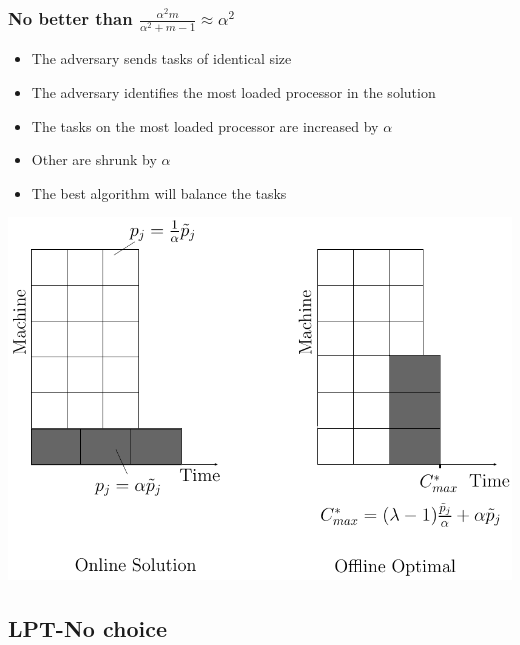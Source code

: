 \documentclass[usenames,dvipsnames]{beamer}
\begin{document}
\begin{frame}
  \frametitle{No better than $\frac{\alpha^{2}m }{\alpha^{2} + m-1} \approx \alpha^2$}

  \begin{itemize}
  \item The adversary sends tasks of identical size
  \item The adversary identifies the most loaded processor in the solution
  \item The tasks on the most loaded processor are increased by $\alpha$
  \item Other are shrunk by $\alpha$
  \item The best algorithm will balance the tasks
  \end{itemize}
  
  \begin{center}
    \includegraphics[width=.6\linewidth]{figs/model1.pdf}
  \end{center}
\end{frame}

\subsection{LPT-No choice}
\end{document}
